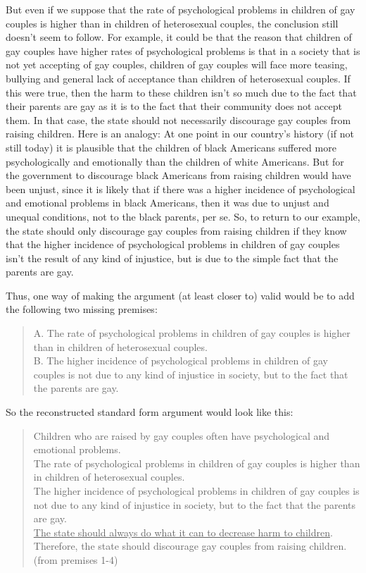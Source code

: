 But even if we suppose that the rate of psychological problems in children of
gay couples is higher than in children of heterosexual couples, the conclusion
still doesn't seem to follow. For example, it could be that the reason that
children of gay couples have higher rates of psychological problems is that in a
society that is not yet accepting of gay couples, children of gay couples will face
more teasing, bullying and general lack of acceptance than children of
heterosexual couples. If this were true, then the harm to these children isn't so
much due to the fact that their parents are gay as it is to the fact that their
community does not accept them. In that case, the state should not necessarily
discourage gay couples from raising children. Here is an analogy: At one point
in our country's history (if not still today) it is plausible that the children of black
Americans suffered more psychologically and emotionally than the children of
white Americans. But for the government to discourage black Americans from
raising children would have been unjust, since it is likely that if there was a
higher incidence of psychological and emotional problems in black Americans,
then it was due to unjust and unequal conditions, not to the black parents, per
se. So, to return to our example, the state should only discourage gay couples
from raising children if they know that the higher incidence of psychological
problems in children of gay couples isn't the result of any kind of injustice, but is
due to the simple fact that the parents are gay.

Thus, one way of making the argument (at least closer to) valid would be to add
the following two missing premises:

\begin{quote}
A. The rate of psychological problems in children of gay couples is
higher than in children of heterosexual couples. \\
B. The higher incidence of psychological problems in children of gay
couples is not due to any kind of injustice in society, but to the fact
that the parents are gay.
\end{quote}

So the reconstructed standard form argument would look like this:

\begin{quote}
Children who are raised by gay couples often have psychological and
emotional problems. \\
The rate of psychological problems in children of gay couples is
higher than in children of heterosexual couples. \\
The higher incidence of psychological problems in children of gay
couples is not due to any kind of injustice in society, but to the fact
that the parents are gay. \\
\underline{The state should always do what it can to decrease harm to children}. \\
Therefore, the state should discourage gay couples from raising
children. (from premises 1-4) \\
\end{quote}

